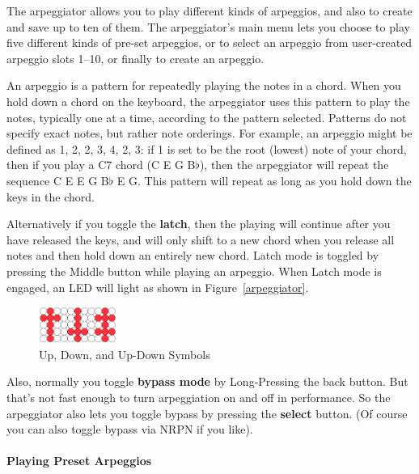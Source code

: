 \documentclass{article}
\begin{document}
The arpeggiator allows you to play different kinds of arpeggios, and also to create and save up to ten of them.  The arpeggiator's main menu lets you choose to play five different kinds of pre-set arpeggios, or to select an arpeggio from user-created arpeggio slots 1--10, or finally to create an arpeggio.

An arpeggio is a pattern for repeatedly playing the notes in a chord.  When you hold down a chord on the keyboard, the arpeggiator uses this pattern to play the notes, typically one at a time, according to the pattern selected.  Patterns do not specify exact notes, but rather note orderings.  For example, an arpeggio might be defined as 1, 2, 2, 3, 4, 2, 3: if 1 is set to be the root (lowest) note of your chord, then if you play a C7 chord (C E G B$\flat$), then the arpeggiator will repeat the sequence C E E G B$\flat$ E G.  This pattern will repeat as long as you hold down the keys in the chord.  

Alternatively if you toggle the {\bf latch}, then the playing will continue after you have released the keys, and will only shift to a new chord when you release all notes and then hold down an entirely new chord.  Latch mode is toggled by pressing the Middle button while playing an arpeggio.  When Latch mode is engaged, an LED will light as shown in Figure~\ref{arpeggiator}.

\begin{figure}
\begin{center}
\vspace{-2em}\includegraphics[width=1in]{updown}
\vspace{-1em}
\caption{\small Up, Down, and Up-Down Symbols}
\vspace{-3em}
\end{center}
\end{figure}


Also, normally you toggle {\bf bypass mode} by Long-Pressing the back button.  But that's not fast enough to turn arpeggiation on and off in performance.  So the arpeggiator also lets you toggle bypass by pressing the {\bf select} button.  (Of course you can also toggle bypass via NRPN if you like). 


\paragraph{Playing Preset Arpeggios}
\end{document}
